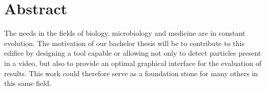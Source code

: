 \chapter{Abstract}
The needs in the fields of biology, microbiology and medicine are in constant evolution. The motivation of our bachelor thesis will be to contribute to this edifice by designing a tool capable or allowing not only to detect particles present in a video, but also to provide an optimal graphical interface for the evaluation of results. This work could therefore serve as a foundation stone for many others in this same field.
